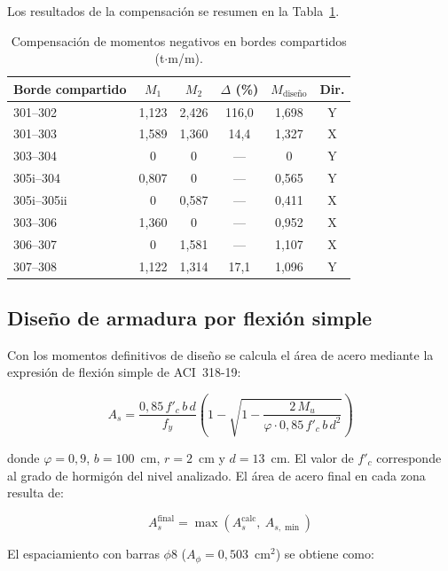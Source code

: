 Los resultados de la compensación se resumen en la Tabla~\ref{tab:compensacion}.
 
\begin{table}[h!]
\centering
\caption{Compensación de momentos negativos en bordes compartidos (t$\cdot$m/m).}
\label{tab:compensacion}
\begin{tabular}{lccccc}
\toprule
Borde compartido & $M_1$ & $M_2$ & $\Delta$ (\%) & $M_{\text{diseño}}$ & Dir. \\
\midrule
301--302   & 1{,}123 & 2{,}426 & 116{,}0 & 1{,}698 & Y \\
301--303   & 1{,}589 & 1{,}360 &  14{,}4 & 1{,}327 & X \\
303--304   & 0       & 0       &    ---  & 0       & Y \\
305i--304  & 0{,}807 & 0       &    ---  & 0{,}565 & Y \\
305i--305ii& 0       & 0{,}587 &    ---  & 0{,}411 & X \\
303--306   & 1{,}360 & 0       &    ---  & 0{,}952 & X \\
306--307   & 0       & 1{,}581 &    ---  & 1{,}107 & X \\
307--308   & 1{,}122 & 1{,}314 &  17{,}1 & 1{,}096 & Y \\
\bottomrule
\end{tabular}
\end{table}
 
\subsection{Diseño de armadura por flexión simple}
 
Con los momentos definitivos de diseño se calcula el área de acero mediante la expresión de flexión simple de ACI~318-19:
 
\begin{equation}
A_s = \frac{0{,}85\,f'_c\,b\,d}{f_y}
      \left(1 - \sqrt{1 - \frac{2\,M_u}{\varphi\cdot 0{,}85\,f'_c\,b\,d^{2}}}\right)
\end{equation}
 
donde $\varphi = 0{,}9$, $b = 100$~cm, $r = 2$~cm y $d = 13$~cm. El valor de $f'_c$ corresponde al grado de hormigón del nivel analizado. El área de acero final en cada zona resulta de:
 
\begin{equation}
    A_s^{\text{final}} = \max\!\left(A_s^{\text{calc}},\ A_{s,\min}\right)
\end{equation}
 
El espaciamiento con barras $\phi 8$ ($A_\phi = 0{,}503$~cm$^2$) se obtiene como:
 
